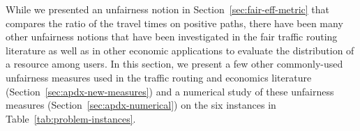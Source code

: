 \documentclass{article}
\begin{document}
While we presented an unfairness notion in Section~\ref{sec:fair-eff-metric} that compares the ratio of the travel times on positive paths, there have been many other unfairness notions that have been investigated in the fair traffic routing literature as well as in other economic applications to evaluate the distribution of a resource among users. In this section, we present a few other commonly-used unfairness measures used in the traffic routing and economics literature (Section~\ref{sec:apdx-new-measures}) and a numerical study of these unfairness measures (Section~\ref{sec:apdx-numerical}) on the six instances in Table~\ref{tab:problem-instances}.


\end{document}
